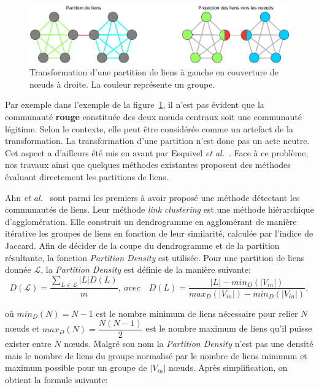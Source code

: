 \begin{figure}
\centering
\includegraphics[width=0.9\linewidth]{img/ExpectedNodes/Partition_Couverture}
\caption{Transformation d'une partition de liens à gauche en couverture de n\oe{}uds à droite. La couleur représente un groupe.}
\label{fig:Partition_Couverture}
\end{figure}


Par exemple dans l'exemple de la figure~\ref{fig:Partition_Couverture}, il n'est pas évident que la communauté \textcolor{briquered}{\textbf{rouge}} constituée des deux n\oe{}uds centraux soit une communauté légitime.
Selon le contexte, elle peut être considérée comme un artefact de la transformation.
La transformation d'une partition n'est donc pas un acte neutre.
Cet aspect a d'ailleurs été mis en avant par Esquivel \emph{et al.}~\cite{Esquivel2011}.
Face à ce problème, nos travaux ainsi que quelques méthodes existantes proposent des méthodes évaluant directement les partitions de liens.

Ahn \emph{et al.}~\cite{Ahn2010a} sont parmi les premiers à avoir proposé une méthode détectant les communautés de liens.
Leur méthode \emph{link clustering} est une méthode hiérarchique d'agglomération.
Elle construit un dendrogramme en agglomérant de manière itérative les groupes de liens en fonction de leur similarité, calculée par l'indice de Jaccard.
Afin de décider de la coupe du dendrogramme et de la partition résultante, la fonction \emph{Partition Density} est utilisée.
Pour une partition de liens donnée $\mathcal{L}$, la \emph{Partition Density} est définie de la manière suivante:
\begin{equation}
D(\mathcal{L}) = \dfrac{\sum_{L \in \mathcal{L}}|L|D(L)}{m},\ avec \quad  D(L) = \dfrac{|L|- min_D(|V_{in}|) }{max_D(|V_{in}|) - min_D(|V_{in}|)},
\end{equation}

où $min_D(N) = N - 1$ est le nombre minimum de liens nécessaire pour relier $N$ n\oe{}uds et $max_D(N) = \dfrac{N(N - 1)}{2}$ est le nombre maximum de liens qu'il puisse exister entre $N$ n\oe{}uds.
Malgré son nom la \emph{Partition Density} n'est pas une densité mais le nombre de liens du groupe normalisé par le nombre de liens minimum et maximum possible pour un groupe de $|V_{in}|$ n\oe{}uds.
Après simplification, on obtient la formule suivante:

